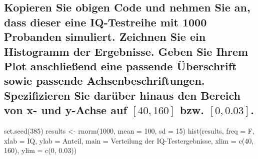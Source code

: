 \documentclass[12pt,a4paper]{article}
\newenvironment{Shaded}{\begin{snugshade}}{\end{snugshade}}
\newcommand{\AttributeTok}[1]{\textcolor[rgb]{0.77,0.63,0.00}{#1}}
\newcommand{\DecValTok}[1]{\textcolor[rgb]{0.00,0.00,0.81}{#1}}
\newcommand{\FloatTok}[1]{\textcolor[rgb]{0.00,0.00,0.81}{#1}}
\newcommand{\FunctionTok}[1]{\textcolor[rgb]{0.00,0.00,0.00}{#1}}
\newcommand{\NormalTok}[1]{#1}
\newcommand{\OtherTok}[1]{\textcolor[rgb]{0.56,0.35,0.01}{#1}}
\newcommand{\StringTok}[1]{\textcolor[rgb]{0.31,0.60,0.02}{#1}}
\begin{document}
\hypertarget{kopieren-sie-obigen-code-und-nehmen-sie-an-dass-dieser-eine-iq-testreihe-mit-1000-probanden-simuliert.-zeichnen-sie-ein-histogramm-der-ergebnisse.-geben-sie-ihrem-plot-anschlieuxdfend-eine-passende-uxfcberschrift-sowie-passende-achsenbeschriftungen.-spezifizieren-sie-daruxfcber-hinaus-den-bereich-von-x--und-y-achse-auf-40160-bzw.-00.03.}{%
\subsection{\texorpdfstring{Kopieren Sie obigen Code und nehmen Sie an,
dass dieser eine IQ-Testreihe mit 1000 Probanden simuliert. Zeichnen Sie
ein Histogramm der Ergebnisse. Geben Sie Ihrem Plot anschließend eine
passende Überschrift sowie passende Achsenbeschriftungen. Spezifizieren
Sie darüber hinaus den Bereich von x- und y-Achse auf \([40,160]\) bzw.
\([0,0.03]\).}{Kopieren Sie obigen Code und nehmen Sie an, dass dieser eine IQ-Testreihe mit 1000 Probanden simuliert. Zeichnen Sie ein Histogramm der Ergebnisse. Geben Sie Ihrem Plot anschließend eine passende Überschrift sowie passende Achsenbeschriftungen. Spezifizieren Sie darüber hinaus den Bereich von x- und y-Achse auf {[}40,160{]} bzw. {[}0,0.03{]}.}}\label{kopieren-sie-obigen-code-und-nehmen-sie-an-dass-dieser-eine-iq-testreihe-mit-1000-probanden-simuliert.-zeichnen-sie-ein-histogramm-der-ergebnisse.-geben-sie-ihrem-plot-anschlieuxdfend-eine-passende-uxfcberschrift-sowie-passende-achsenbeschriftungen.-spezifizieren-sie-daruxfcber-hinaus-den-bereich-von-x--und-y-achse-auf-40160-bzw.-00.03.}}

\begin{Shaded}
\begin{Highlighting}[]
    \FunctionTok{set.seed}\NormalTok{(}\DecValTok{385}\NormalTok{)}
\NormalTok{    results }\OtherTok{\textless{}{-}} \FunctionTok{rnorm}\NormalTok{(}\DecValTok{1000}\NormalTok{, }\AttributeTok{mean =} \DecValTok{100}\NormalTok{, }\AttributeTok{sd =} \DecValTok{15}\NormalTok{)}
    \FunctionTok{hist}\NormalTok{(results, }
         \AttributeTok{freq =}\NormalTok{ F,}
         \AttributeTok{xlab =} \StringTok{\textquotesingle{}IQ\textquotesingle{}}\NormalTok{, }
         \AttributeTok{ylab =} \StringTok{\textquotesingle{}Anteil\textquotesingle{}}\NormalTok{, }
         \AttributeTok{main =} \StringTok{\textquotesingle{}Verteilung der IQ{-}Testergebnisse\textquotesingle{}}\NormalTok{, }
         \AttributeTok{xlim =} \FunctionTok{c}\NormalTok{(}\DecValTok{40}\NormalTok{, }\DecValTok{160}\NormalTok{), }
         \AttributeTok{ylim =} \FunctionTok{c}\NormalTok{(}\DecValTok{0}\NormalTok{, }\FloatTok{0.03}\NormalTok{))}
\end{Highlighting}
\end{Shaded}
\end{document}
